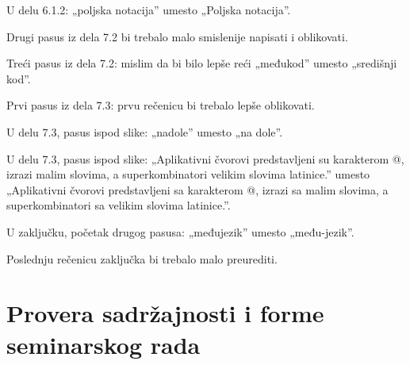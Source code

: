 \documentclass[a4paper]{report}
\begin{document}
U delu 6.1.2: „poljska notacija” umesto „Poljska notacija”.

Drugi pasus iz dela 7.2 bi trebalo malo smislenije napisati i oblikovati.

Treći pasus iz dela 7.2: mislim da bi bilo lepše reći „međukod” umesto „središnji kod”.

Prvi pasus iz dela 7.3: prvu rečenicu bi trebalo lepše oblikovati.

U delu 7.3, pasus ispod slike: „nadole” umesto „na dole”.

U delu 7.3, pasus ispod slike: „Aplikativni čvorovi predstavljeni su karakterom @, izrazi malim slovima, a superkombinatori velikim slovima latinice.” umesto „Aplikativni čvorovi predstavljeni sa karakterom @, izrazi sa malim slovima, a superkombinatori sa velikim slovima latinice.”.

U zaključku, početak drugog pasusa: „međujezik” umesto „među-jezik”.

Poslednju rečenicu zaključka bi trebalo malo preurediti.

\section{Provera sadržajnosti i forme seminarskog rada}
\end{document}
